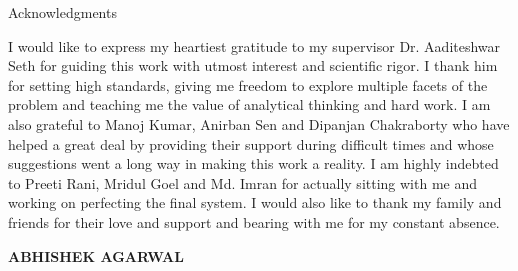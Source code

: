 \begin{center}
\LARGE{Acknowledgments}  %
\end{center}

\vspace{0.5in}

I would like to express my heartiest gratitude to my supervisor Dr. Aaditeshwar Seth for guiding this work with utmost interest and scientific rigor. I thank him for setting high standards, giving me freedom to explore multiple facets of the problem and teaching me the value of analytical thinking and hard work. I am also grateful to Manoj Kumar, Anirban Sen and Dipanjan Chakraborty who have helped a great deal by providing their support during difficult times and whose suggestions went a long way in making this work a reality. I am highly indebted to Preeti Rani, Mridul Goel and Md. Imran for actually sitting with me and working on perfecting the final system. I would also like to thank my family and friends for their love and support and bearing with me for my constant absence.\\

\vspace{1.5in}

{\bfseries ABHISHEK AGARWAL}

